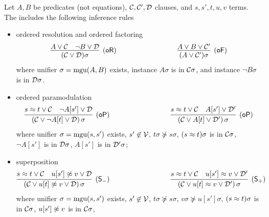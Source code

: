 
\begin{definition}\label{def:superposition-calculus}
	Let \( A,B \) be predicates (not equations),
	\( \mathcal{C},\mathcal{C}',\mathcal{D} \) clauses, and \( s,s', t,u,v \) terms.
	The  \cite{GM2015ar} includes the following inference rules
	\begin{itemize}
		\item ordered resolution and ordered factoring
		\begin{gather*}
		\infer
		[\mathsf{(oR)}]
		{(\mcC \lor \mcD)\sigma}
		{{ A} \lor\mcC & { \lnot B} \lor\mcD}
		\hspace{3cm}
		\infer
		[\mathsf{(oF)}]
		{(A \lor \mcC')\sigma}
		{{ A}\lor B\lor\mcC'}
		\end{gather*}
		where unifier \( \sigma=\operatorname{mgu}(A,B) \) exists,
		instance \( A\sigma \) is \txtSTRICTLY{} in \( \mathcal{C} \sigma \),
		and	instance \( \lnot B\sigma \) is \txtMAXIMAL{} in \( \mathcal{D}\sigma \).
		\item ordered paramodulation
		\begin{gather*}
		\infer
		[\mathsf{(oP)}]
		{(\mcC\lor \lnot A[t]\lor\mcD)\,\sigma}
		{{ s\mEQ t} \lor\mcC\quad { \lnot A[s']}\lor\mcD}
		\hspace{3cm}
		\infer
		[\mathsf{(oP)}]
		{(\mcC\lor A[t]\lor\mcD')\,\sigma}
		{{ s\mEQ t} \lor\mcC\quad { A[s']}\lor\mcD'}
\end{gather*}
where unifier \( \sigma=\operatorname{mgu}(s,s') \) exists, 
\( s'\not\in\mathcal{V} \),
\( t\sigma\not\succcurlyeq s\sigma \),
\( (s\approx t)\sigma \) is \txtSTRICTLY{} in \( \mathcal{C}\sigma \),
\( \lnot A[s'] \) is \txtMAXIMAL{} in \( \mathcal{D}\sigma \),
\( A[s'] \) is \txtSTRICTLY{} in \( \mathcal{D}'\sigma \);
\item superposition
\begin{gather*}
		\infer
		[\mathsf{(S_-)}]
		{(\mcC\lor u[t]\mNE v\lor\mcD)\,\sigma}
		{{ s\mEQ t}\lor\mcC\quad { u[s']\mNE v}\lor\mcD}
		\hspace{3cm}
		\infer
		[\mathsf{(S_+)}]
		{(\mcC\lor u[t]\mEQ v\lor\mcD')\,\sigma}
		{{ s\mEQ t}\lor\mcC\quad { u[s']\mEQ v}\lor\mcD'}
		\end{gather*}
		where unifier \( \sigma=\operatorname{mgu}(s,s') \) exists,
		\( s'\not\in\mathcal{V} \),
		\( t\sigma\not\succcurlyeq s\sigma \),
		\( v\sigma\not\succcurlyeq u[s']\sigma \),
		\( (s\approx t)\sigma \) is \txtSTRICTLY{} in \( \mathcal{C}\sigma \),
		\( u[s']\not\approx v \) is \txtMAXIMAL{} in \( \mathcal{C}\sigma \),

\end{itemize}
\end{definition}
